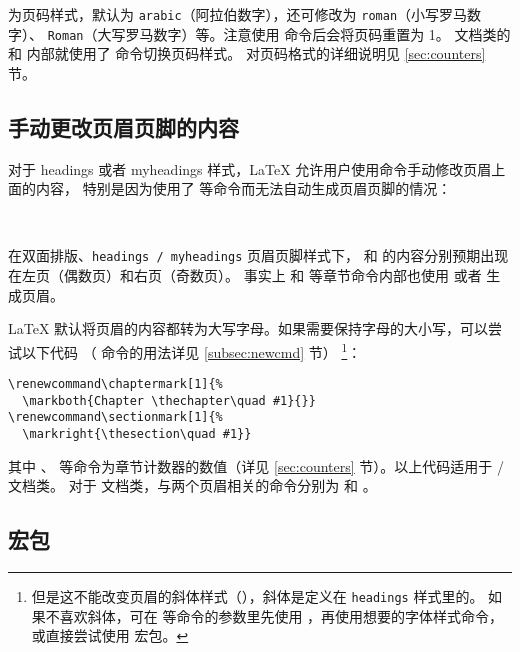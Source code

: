  为页码样式，默认为 \texttt{arabic}（阿拉伯数字），还可修改为 \texttt{roman}（小写罗马数字）、
\texttt{Roman}（大写罗马数字）等。注意使用  命令后会将页码重置为 1。 文档类的  和  内部就使用了  命令切换页码样式。
对页码格式的详细说明见 \ref{sec:counters} 节。

\subsection{手动更改页眉页脚的内容}\label{subsec:marks}

对于 headings 或者 myheadings 样式，\LaTeX{} 允许用户使用命令手动修改页眉上面的内容，
特别是因为使用了  等命令而无法自动生成页眉页脚的情况：
\begin{command}
\\
\end{command}

在双面排版、\texttt{headings / myheadings} 页眉页脚样式下， 和  的内容分别预期出现在左页（偶数页）和右页（奇数页）。
事实上  和  等章节命令内部也使用  或者  生成页眉。

\LaTeX{} 默认将页眉的内容都转为大写字母。如果需要保持字母的大小写，可以尝试以下代码
（\cmd{\renewcommand} 命令的用法详见 \ref{subsec:newcmd} 节）%
\footnote{但是这不能改变页眉的斜体样式（），斜体是定义在 \texttt{headings} 样式里的。
如果不喜欢斜体，可在  等命令的参数里先使用 ，再使用想要的字体样式命令，
或直接尝试使用  宏包。}：
\begin{verbatim}
\renewcommand\chaptermark[1]{%
  \markboth{Chapter \thechapter\quad #1}{}}
\renewcommand\sectionmark[1]{%
  \markright{\thesection\quad #1}}
\end{verbatim}

其中 、 等命令为章节计数器的数值（详见 \ref{sec:counters} 节）。以上代码适用于  /  文档类。
对于  文档类，与两个页眉相关的命令分别为  和 。

\subsection{ 宏包}\label{subsec:fancyhdr}

